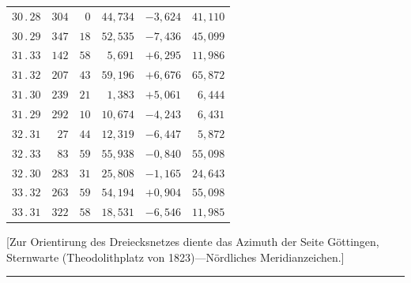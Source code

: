 \begin{center}
\begin{tabular}[t]{|c|r@{\;}r@{\;}r|r|r|}
$30\, .\, 28$ & $304$ & $0$ & $44{,}734$ & $-3{,}624$ & $41{,}110$\\
$30\, .\, 29$ & $347$ & $18$ & $52{,}535$ & $-7{,}436$ & $45{,}099$\\[7pt]
$31\, .\, 33$ & $142$ & $58$ & $5{,}691$ & $+6{,}295$ & $11{,}986$\\
$31\, .\, 32$ & $207$ & $43$ & $59{,}196$ & $+6{,}676$ & $65{,}872$\\
$31\, .\, 30$ & $239$ & $21$ & $1{,}383$ & $+5{,}061$ & $6{,}444$\\
$31\, .\, 29$ & $292$ & $10$ & $10{,}674$ & $-4{,}243$ & $6{,}431$\\[7pt]
$32\, .\, 31$ & $27$ & $44$ & $12{,}319$ & $-6{,}447$ & $5{,}872$\\
$32\, .\, 33$ & $83$ & $59$ & $55{,}938$ & $-0{,}840$ & $55{,}098$\\
$32\, .\, 30$ & $283$ & $31$ & $25{,}808$ & $-1{,}165$ & $24{,}643$\\[7pt]
$33\, .\, 32$ & $263$ & $59$ & $54{,}194$ & $+0{,}904$ & $55{,}098$\\
$33\, .\, 31$ & $322$ & $58$ & $18{,}531$ & $-6{,}546$ & $11{,}985$\\
\end{tabular}
\end{center}

[Zur Orientirung des Dreiecksnetzes diente das Azimuth der Seite Göttingen,
Sternwarte (Theodolithplatz von 1823)---Nördliches Meridianzeichen.]
\begin{center}\rule{.23\linewidth}{.35pt}\end{center}

